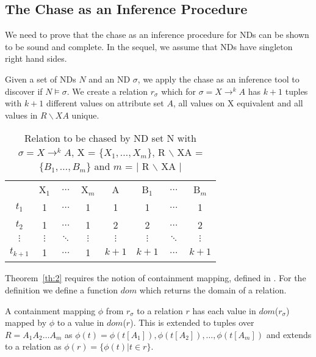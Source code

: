 \subsection{The Chase as an Inference Procedure}\label{subsec:nd_ch_inf}
We need to prove that the chase as an inference procedure for NDs can be shown
to be sound and complete. In the sequel, we assume that NDs have
singleton right hand sides.

Given a set of NDs $N$ and an ND $\sigma$, we apply the chase as an
inference tool to discover if $N \models \sigma$. 
We create a relation $r_\sigma$ which for $\sigma = X \to^k
A$ has $k+1$ tuples with $k+1$ different values on attribute set $A$,
all values on X equivalent and all values in $R \backslash XA$ unique.

{\line
\begin{table}[ht]
\begin{center}
\begin{tabular}{c|c|c|c|c|c|c|c|} \cline{2-8}
 		& X$_1$ 	& $\ldots$ 	& X$_m$ & A 	& B$_1$ & $\ldots$ 	& B$_m$ \\ \cline{2-8}
$t_1$ 		& 1  	& $\ldots$ 	& 1&  1  	& 1 	& $\ldots$ 	& 1 \\
$t_2$ 		& 1  	& $\ldots$ 	& 1&  2  	& 2 	&  $\ldots$ 	& 2 \\
$\vdots$ 	& $\vdots$  &  $\ddots$ & $\vdots$  &  $\vdots$  & $\vdots$ & $\ddots$ & $\vdots$ \\
$t_{k+1}$ 	& 1  &  $\ldots$  &  1  & $k+1$  & $k+1$ & $\ldots$ 	& $k+1$ \\ \cline{2-8}
\end{tabular}
\end{center}
\caption{\label{tbl:rel_chase1} Relation to be chased by ND set N with
$\sigma = X \to^k A$, X = $\{ X_1, \ldots, X_m \}$, R $\backslash$ XA = $\{ B_1, \ldots, B_m \}$
and $m$ = $|$ R $\backslash$ XA $|$}
\end{table}}	

Theorem~\ref{th:2} requires the notion of containment mapping, defined
in \cite{atze93}. For the definition we define a function $dom$ which
returns the domain of a relation.

\begin{definition}\label{def:cm}
\begin{rm}
A containment mapping $\phi$ from $r_\sigma$ to a relation $r$ has
each value in $dom$($r_\sigma$) mapped by $\phi$ to a value in $dom$($r$).
This is extended to tuples over $R = A_1A_2 \ldots A_m$ as $\phi(t) =
\phi(t[A_1]),\phi(t[A_2]),\ldots, \phi(t[A_m])$ and extends to a
relation as $\phi(r) = \{ \phi(t) | t \in r \}$.
\end{rm}
\end{definition}

